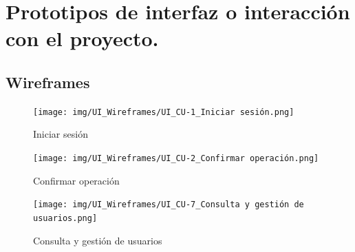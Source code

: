 \section{Prototipos de interfaz o interacción con el proyecto.}

\subsection{Wireframes}

\begin{figure}[h]
    \centering
    \texttt{[image: img/UI\_Wireframes/UI\_CU-1\_Iniciar sesión.png]}
    \caption{Iniciar sesión}
    \label{fig:Iniciar sesión}
\end{figure}

\begin{figure}[h]
    \centering
    \texttt{[image: img/UI\_Wireframes/UI\_CU-2\_Confirmar operación.png]}
    \caption{Confirmar operación}
    \label{fig:Confirmar operación}
\end{figure}

\begin{figure}[h]
    \centering
    \texttt{[image: img/UI\_Wireframes/UI\_CU-7\_Consulta y gestión de usuarios.png]}
    \caption{Consulta y gestión de usuarios}
    \label{fig:Consulta y gestión de usuarios}
\end{figure}

